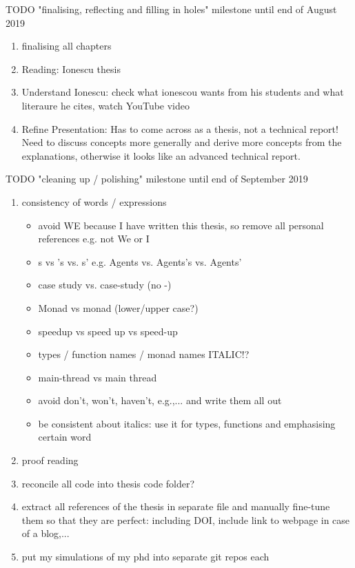 \documentclass[oneside]{book}
\begin{document}
TODO "finalising, reflecting and filling in holes" milestone until end of August 2019
\begin{enumerate}
	\item finalising all chapters
	
	\item Reading: Ionescu thesis
	
	\item Understand Ionescu: check what ionescou wants from his students and what literaure he cites, watch YouTube video

	\item Refine Presentation: Has to come across as a thesis, not a technical report! Need to discuss concepts more generally and derive more concepts from the explanations, otherwise it looks like an advanced technical report.
\end{enumerate}

TODO "cleaning up / polishing" milestone until end of September 2019
\begin{enumerate}
	\item consistency of words / expressions
		\begin{itemize}
			\item avoid WE because I have written this thesis, so remove all personal references e.g. not We or I
			\item s vs 's vs. s' e.g. Agents vs. Agents's vs. Agents'
			\item case study vs. case-study (no -)
			\item Monad vs monad (lower/upper case?)
			\item speedup vs speed up vs speed-up
			\item types / function names / monad names ITALIC!?
			\item main-thread vs main thread
			\item avoid don't, won't, haven't, e.g.,... and write them all out
			\item be consistent about italics: use it for types, functions and emphasising certain word
		\end{itemize}
	\item proof reading
	
	\item reconcile all code into thesis code folder?
	
	\item extract all references of the thesis in separate file and manually fine-tune them so that they are perfect: including DOI, include link to webpage in case of a blog,...
	
	\item put my simulations of my phd into separate git repos each
\end{enumerate}
\end{document}
